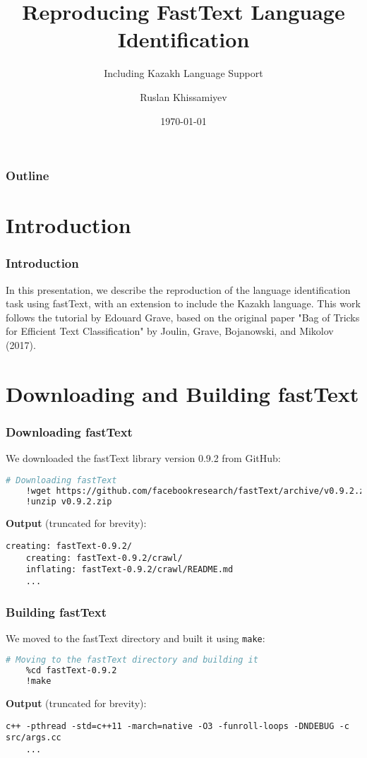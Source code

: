 \documentclass{beamer}
\title{Reproducing FastText Language Identification}
\subtitle{Including Kazakh Language Support}
\author{Ruslan Khissamiyev}
\institute{Macquarie University}
\date{\today}
\begin{document}
\begin{frame}
    \titlepage
\end{frame}

\begin{frame}
    \frametitle{Outline}
    \tableofcontents
\end{frame}

\section{Introduction}
\begin{frame}
    \frametitle{Introduction}
    In this presentation, we describe the reproduction of the language identification task using fastText, with an extension to include the Kazakh language. This work follows the tutorial by Edouard Grave, based on the original paper "Bag of Tricks for Efficient Text Classification" by Joulin, Grave, Bojanowski, and Mikolov (2017).
\end{frame}

\section{Downloading and Building fastText}

\begin{frame}[fragile]
    \frametitle{Downloading fastText}
    We downloaded the fastText library version 0.9.2 from GitHub:
    \begin{lstlisting}[language=bash]
    # Downloading fastText
    !wget https://github.com/facebookresearch/fastText/archive/v0.9.2.zip
    !unzip v0.9.2.zip
    \end{lstlisting}
    \textbf{Output} (truncated for brevity):
    \begin{lstlisting}[basicstyle=\ttfamily\scriptsize]
    creating: fastText-0.9.2/
    creating: fastText-0.9.2/crawl/
    inflating: fastText-0.9.2/crawl/README.md
    ...
    \end{lstlisting}
\end{frame}

\begin{frame}[fragile]
    \frametitle{Building fastText}
    We moved to the fastText directory and built it using \texttt{make}:
    \begin{lstlisting}[language=bash]
    # Moving to the fastText directory and building it
    %cd fastText-0.9.2
    !make
    \end{lstlisting}
    \textbf{Output} (truncated for brevity):
    \begin{lstlisting}[basicstyle=\ttfamily\scriptsize]
    c++ -pthread -std=c++11 -march=native -O3 -funroll-loops -DNDEBUG -c src/args.cc
    ...
    \end{lstlisting}
\end{frame}
\end{document}
